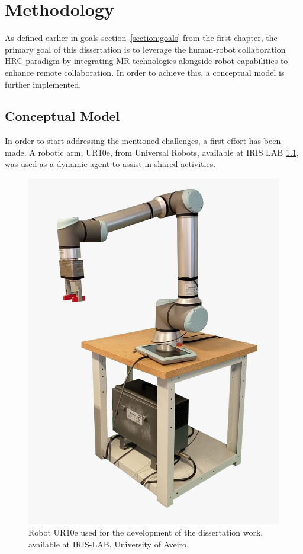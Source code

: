 \chapter{Methodology}%
\label{chapter:methodology}

As defined earlier in goals section~\ref{section:goals} from the first chapter, the primary goal of this dissertation is to leverage the human-robot collaboration \ac{HRC} paradigm by integrating \ac{MR} technologies alongside robot capabilities to enhance remote collaboration. In order to achieve this, a conceptual model is further implemented.

\section{Conceptual Model}
In order to start addressing the mentioned challenges, a first effort has been made. A robotic arm, UR10e, from Universal Robots, 
available at IRIS LAB \ref{f:ur10e_iris}, was used as a dynamic agent to assist in shared activities.

\begin{figure}[h]
    \centering
    \includegraphics[width=0.4\linewidth]{figs/ur10e.jpeg}
    \caption{Robot UR10e used for the development of the dissertation work, available at IRIS-LAB, University of Aveiro}
    \label{f:ur10e_iris}
\end{figure}


